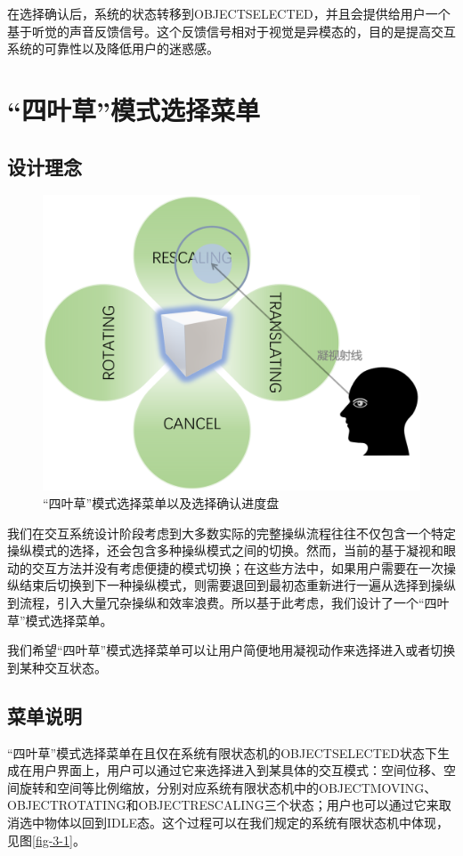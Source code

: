 在选择确认后，系统的状态转移到OBJECT\us SELECTED，并且会提供给用户一个基于听觉的声音反馈信号。这个反馈信号相对于视觉是异模态的，目的是提高交互系统的可靠性以及降低用户的迷惑感。

\section{“四叶草”模式选择菜单}
\label{Clover}

\subsection{设计理念}

\begin{figure}[t!]
    \centering
    \includegraphics[width=.55\textwidth]{figure/clover.png}
    \caption{“四叶草”模式选择菜单以及选择确认进度盘}
    \label{fig-3-4}
\end{figure}

我们在交互系统设计阶段考虑到大多数实际的完整操纵流程往往不仅包含一个特定操纵模式的选择，还会包含多种操纵模式之间的切换。然而，当前的基于凝视和眼动的交互方法并没有考虑便捷的模式切换；在这些方法中，如果用户需要在一次操纵结束后切换到下一种操纵模式，则需要退回到最初态重新进行一遍从选择到操纵到流程，引入大量冗杂操纵和效率浪费。所以基于此考虑，我们设计了一个“四叶草”模式选择菜单。

我们希望“四叶草”模式选择菜单可以让用户简便地用凝视动作来选择进入或者切换到某种交互状态。

\subsection{菜单说明}

“四叶草”模式选择菜单在且仅在系统有限状态机的OBJECT\us SELECTED状态下生成在用户界面上，用户可以通过它来选择进入到某具体的交互模式：空间位移、空间旋转和空间等比例缩放，分别对应系统有限状态机中的OBJECT\us MOVING、OBJECT\us ROTATING和OBJECT\us RESCALING三个状态；用户也可以通过它来取消选中物体以回到IDLE态。这个过程可以在我们规定的系统有限状态机中体现，见图\ref{fig-3-1}。

